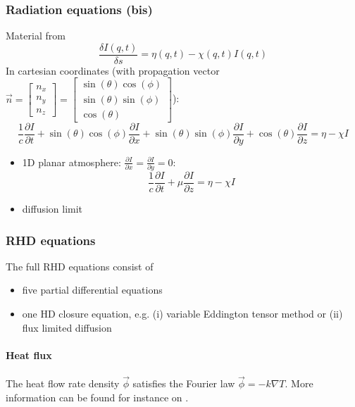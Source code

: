 \documentclass[../main/main.tex]{subfiles}
\begin{document}
\subsubsection{Radiation equations (bis)}
Material from \cite{TheoryStellarAtmospheres2014}
\begin{equation}
\frac{\delta I(q,t)}{\delta s} = \eta (q,t) - \chi(q,t) I(q,t)
\end{equation}
In cartesian coordinates (with propagation vector $\vec{n} = \left[ \begin{matrix} n_x \\ n_y \\ n_z \end{matrix}  \right]  = \left[ \begin{matrix} \sin(\theta) \cos(\phi) \\ \sin(\theta) \sin(\phi)  \\ \cos(\theta) \end{matrix}  \right]$):
\begin{equation}
\frac{1}{c}\frac{\partial I}{\partial t} + \sin(\theta)\cos(\phi)\frac{\partial I}{\partial x} + \sin(\theta)\sin(\phi)\frac{\partial I}{\partial y} + \cos(\theta) \frac{\partial I}{\partial z} = \eta - \chi I
\end{equation}
\begin{itemize}
\item 1D planar atmosphere: $\frac{\partial I}{\partial x} = \frac{\partial I}{\partial y} = 0$:
\begin{equation}
\frac{1}{c} \frac{\partial I}{\partial t} + \mu \frac{\partial I}{\partial z} = \eta - \chi I
\end{equation}

\item diffusion limit
\end{itemize}

\subsubsection{RHD equations}
The full RHD equations consist of 
\begin{itemize}
\item five partial differential equations
\item one HD closure equation, e.g. (i) variable Eddington tensor method or (ii) flux limited diffusion
\end{itemize}

\paragraph{Heat flux}
The heat flow rate density $\vec{\phi}$ satisfies the Fourier law $\vec{\phi} = - k\nabla T$. More information can be found for instance on \cite{WikiHeat}.
\end{document}

